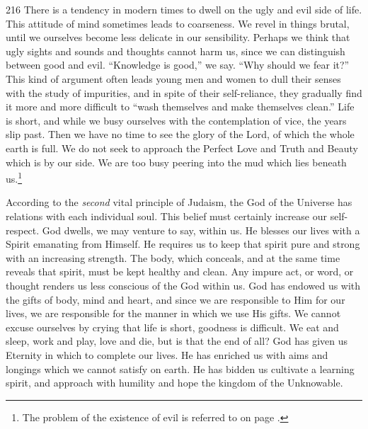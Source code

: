 \begin{tp}{216}
There is a tendency in modern times to
dwell on the ugly and evil side of life.
This attitude of mind sometimes leads
to coarseness. We revel in things brutal,
until we ourselves become less delicate in
our sensibility. Perhaps we think that ugly
sights and sounds and thoughts cannot harm
us, since we can distinguish between good
and evil. “Knowledge is good,” we say.
“Why should we fear it?” This kind of
argument often leads young men and women
to dull their senses with the study of impurities,
and in spite of their self-reliance,
they gradually find it more and more difficult
to “wash themselves and make themselves
clean.” Life is short, and while we busy
ourselves with the contemplation of vice,
the years slip past. Then we have no time
to see the glory of the Lord, of which the
whole earth is full. We do not seek to
approach the Perfect Love and Truth and
Beauty which is by our side. We are too
busy peering into the mud which lies
beneath us.\footnote{The problem of
the existence of evil is referred to on
page \pageref{evil}.}
\end{tp}

According to the \textsl{second} vital principle
of Judaism, the God of the Universe has
relations with each individual soul. This
belief must certainly increase our self-respect.
God dwells, we may venture to say, within
us. He blesses our lives with a Spirit
emanating from Himself. He requires us
to keep that spirit pure and strong with
an increasing strength. The body, which
conceals, and at the same time reveals that
spirit, must be kept healthy and clean.
Any impure act, or word, or thought renders
us less conscious of the God within us.
God has endowed us with the gifts of body,
mind and heart, and since we are responsible
to Him for our lives, we are responsible for
the manner in which we use His gifts. We
cannot excuse ourselves by crying that life
is short, goodness is difficult. We eat and
sleep, work and play, love and die, but is
that the end of all? God has given us
Eternity in which to complete our lives.
He has enriched us with aims and longings
which we cannot satisfy on earth. He has
bidden us cultivate a learning spirit, and
approach with humility and hope the kingdom
of the Unknowable.


